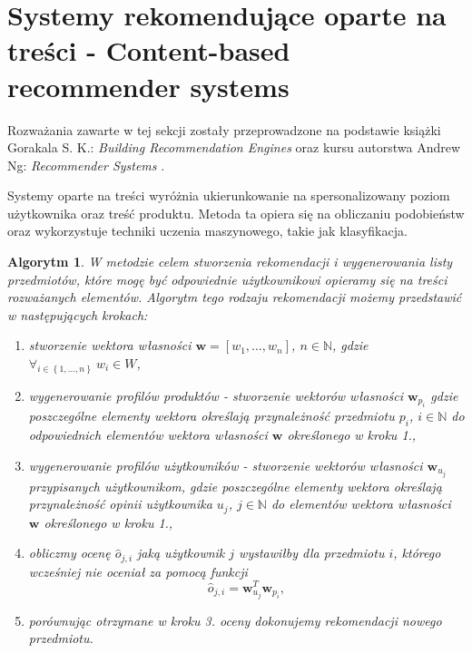\documentclass[12pt,a4paper]{report}
\newtheorem{algorytm}[df]{Algorytm}
\newcommand{\set}[1]{\left\lbrace {#1} \right\rbrace}
\newcommand{\setN}{\mathbb{N}}
\newcommand{\setWlasnosci}{\mathit{W}}
\begin{document}
\section{Systemy rekomendujące oparte na treści - Content-based recommender systems}
Rozważania zawarte w tej sekcji zostały przeprowadzone na podstawie książki Gorakala S. K.: \textit{Building Recommendation Engines} {\citep[Sec 3]{bre}} oraz kursu autorstwa Andrew Ng: \textit{Recommender Systems} {\citep{rs}}.
\bigskip

Systemy oparte na treści wyróżnia ukierunkowanie na spersonalizowany poziom użytkownika oraz treść produktu. Metoda ta opiera się na obliczaniu podobieństw oraz wykorzystuje techniki uczenia maszynowego, takie jak klasyfikacja.

\begin{algorytm}
W metodzie celem stworzenia rekomendacji i wygenerowania listy przedmiotów, które mogę być odpowiednie użytkownikowi opieramy się na treści rozważanych elementów. Algorytm tego rodzaju rekomendacji możemy przedstawić w następujących krokach:
\begin{enumerate}
\item stworzenie wektora własności $\mathbf{w} = [w_1, \ldots, w_n]$, $n \in \setN$, gdzie $\forall_{i \in \set{1, \ldots, n}} \: w_i \in \setWlasnosci$,

\item wygenerowanie profilów produktów - stworzenie wektorów własności $\mathbf{w}_{p_i}$ gdzie poszczególne elementy wektora określają przynależność przedmiotu $p_i$, $i \in \setN$ do odpowiednich elementów wektora własności $\mathbf{w}$ określonego w kroku 1.,

\item wygenerowanie profilów użytkowników - stworzenie wektorów własności $\mathbf{w}_{u_j}$ przypisanych użytkownikom, gdzie poszczególne elementy wektora określają przynależność opinii użytkownika $u_j$, $j \in \setN$ do elementów wektora własności $\mathbf{w}$ określonego w kroku 1.,

\item obliczmy ocenę $\widehat{o}_{j,i}$ jaką użytkownik $j$ wystawiłby dla przedmiotu $i$, którego wcześniej nie oceniał za pomocą funkcji
$$
\widehat{o}_{j,i} = \mathbf{w}_{u_j}^T \mathbf{w}_{p_i},
$$

\item porównując otrzymane w kroku 3. oceny dokonujemy rekomendacji nowego przedmiotu.
\end{enumerate}
\end{algorytm}
\end{document}
